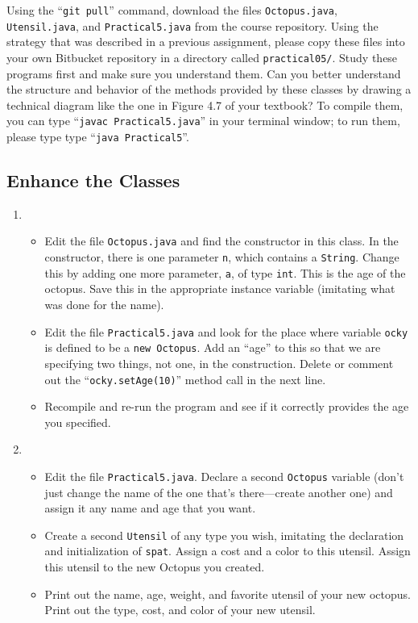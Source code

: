 \begin{sloppypar}
Using the ``{\tt git pull}'' command, download the files {\tt Octopus.java}, {\tt Utensil.java}, and {\tt Practical5.java}
from the course repository. Using the strategy that was described in a previous assignment, please copy these files into
your own Bitbucket repository in a directory called {\tt practical05/}. Study these programs first and make sure you
understand them. Can you better understand the structure and behavior of the methods provided by these classes by
drawing a technical diagram like the one in Figure 4.7 of your textbook? To compile them, you can type ``{\tt javac
  Practical5.java}'' in your terminal window; to run them, please type type ``{\tt java Practical5}''.
\end{sloppypar}

\vspace*{-.15in}
\subsection*{Enhance the Classes} 
\vspace*{-.05in}

\begin{enumerate}
\item 

\begin{itemize}

\item 
Edit the file {\tt Octopus.java} and find the constructor in this class. In the constructor,
there is one parameter {\tt n}, which contains a {\tt String}. 
Change this by adding one more parameter, {\tt a}, of type {\tt int}.
This is the age of the octopus. Save this in the appropriate instance
variable (imitating what was done for the name). 

\item 
\noindent Edit the file {\tt Practical5.java} and look for the place where variable
{\tt ocky} is defined to be a {\tt new Octopus}. Add an ``age'' to this
so that we are specifying two things, not one, in the construction.
Delete or comment out the ``{\tt ocky.setAge(10)}'' method call in the next line. 
\item 
\noindent Recompile and re-run the program and see if it correctly provides the age
you specified.
\end{itemize} \newpage
\item 
\begin{itemize}
\item
Edit the file {\tt Practical5.java}. Declare a second {\tt Octopus} variable (don't
just change the name of the one that's there---create another one) and
assign it any name and age that you want. 
\item
\noindent Create a second {\tt Utensil} of any type you wish, imitating the declaration and
initialization of {\tt spat}.
Assign a cost and a color to this utensil. Assign this utensil to the new
Octopus you created. 
\item
\noindent Print out the name, age, weight, and favorite utensil of your new octopus.
Print out the type, cost, and color of your new utensil.
\end{itemize}
\end{enumerate}

